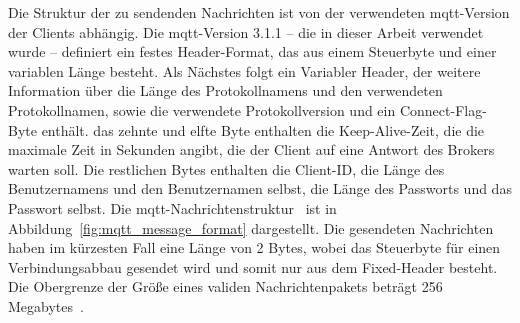 \noindent Die Struktur der zu sendenden Nachrichten ist von der verwendeten \gls{mqtt}-Version der Clients abhängig.
Die \gls{mqtt}-Version 3.1.1 -- die in dieser Arbeit verwendet wurde -- definiert ein festes Header-Format, das aus einem
Steuerbyte und einer variablen Länge besteht.
Als Nächstes folgt ein Variabler Header, der weitere Information über die Länge des Protokollnamens und den verwendeten
Protokollnamen, sowie die verwendete Protokollversion und ein Connect-Flag-Byte enthält.
das zehnte und elfte Byte enthalten die Keep-Alive-Zeit, die die maximale Zeit in Sekunden angibt, die der Client auf eine
Antwort des Brokers warten soll.
Die restlichen Bytes enthalten die Client-ID, die Länge des Benutzernamens und den Benutzernamen selbst, die
Länge des Passworts und das Passwort selbst.
Die \gls{mqtt}-Nachrichtenstruktur~\cite{mqtt} ist in Abbildung~\ref{fig:mqtt_message_format} dargestellt.
\newline
Die gesendeten Nachrichten haben im kürzesten Fall eine Länge von 2 Bytes, wobei das Steuerbyte für einen Verbindungsabbau
gesendet wird und somit nur aus dem Fixed-Header besteht.
Die Obergrenze der Größe eines validen Nachrichtenpakets beträgt 256 Megabytes~\cite{mqtt}.